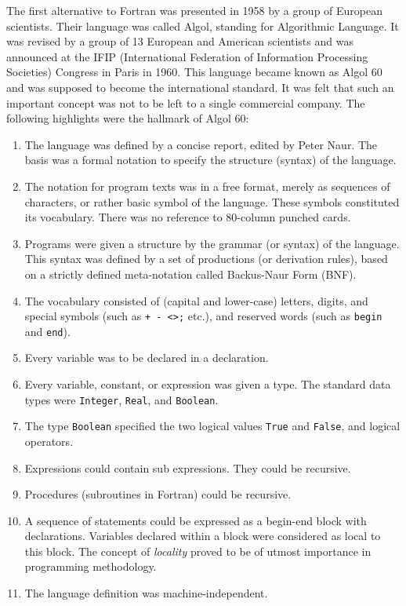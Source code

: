 The first alternative to Fortran was presented in 1958 by a group of European
scientists. Their language was called Algol, standing for Algorithmic Language. It
was revised by a group of 13 European and American scientists and was
announced at the IFIP (International Federation of Information Processing
Societies) Congress in Paris in 1960. This language became known as Algol 60
and was supposed to become the international standard. It was felt that such an
important concept was not to be left to a single commercial company. The
following highlights were the hallmark of Algol 60:
\begin{enumerate}
  \item The language was defined by a concise report, edited by Peter Naur. The
  basis was a formal notation to specify the structure (syntax) of the language.

  \item The notation for program texts was in a free format, merely as sequences
  of characters, or rather basic symbol of the language. These symbols constituted
  its vocabulary. There was no reference to 80-column punched cards.

  \item Programs were given a structure by the grammar (or syntax) of the language.
  This syntax was defined by a set of productions (or derivation rules), based on
  a strictly defined meta-notation called Backus-Naur Form (BNF).

  \item The vocabulary consisted of (capital and lower-case) letters, digits, and
  special symbols (such as \texttt{+ - \textless \textgreater ;} etc.), and
  reserved words (such as \texttt{begin} and \texttt{end}).

  \item Every variable was to be declared in a declaration.

  \item Every variable, constant, or expression was given a type. The standard data
  types were \texttt{Integer}, \texttt{Real}, and \texttt{Boolean}.

  \item The type \texttt{Boolean} specified the two logical values \texttt{True}
  and \texttt{False}, and logical operators.

  \item Expressions could contain sub expressions. They could be recursive.

  \item Procedures (subroutines in Fortran) could be recursive.

  \item A sequence of statements could be expressed as a begin-end block with
  declarations. Variables declared within a block were considered as local to this
  block. The concept of \emph{locality} proved to be of utmost importance in
  programming methodology.

  \item The language definition was machine-independent.
\end{enumerate}

